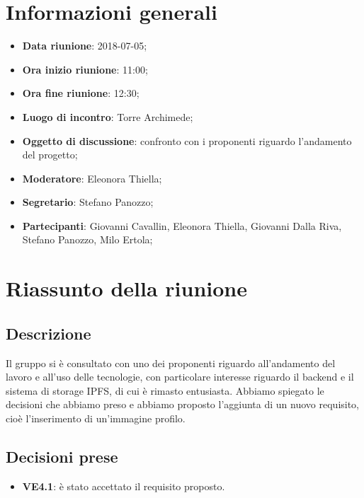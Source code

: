 \section{Informazioni generali}
	\begin{itemize}
		\item \textbf{Data riunione}: 2018-07-05;
		\item \textbf{Ora inizio riunione}: 11:00;
		\item \textbf{Ora fine riunione}: 12:30;
		\item \textbf{Luogo di incontro}: Torre Archimede;
		\item \textbf{Oggetto di discussione}: confronto con i proponenti riguardo l'andamento del progetto;
		\item \textbf{Moderatore}: Eleonora Thiella;
		\item \textbf{Segretario}: Stefano Panozzo;
		\item \textbf{Partecipanti}: Giovanni Cavallin, Eleonora Thiella, Giovanni Dalla Riva, Stefano Panozzo, Milo Ertola;
	\end{itemize}

\section{Riassunto della riunione}
	\subsection{Descrizione} 
	Il gruppo si è consultato con uno dei proponenti riguardo all'andamento del lavoro e all'uso delle tecnologie, con particolare interesse riguardo il backend e il sistema di storage IPFS, di cui è rimasto entusiasta.
	Abbiamo spiegato le decisioni che abbiamo preso e abbiamo proposto l'aggiunta di un nuovo requisito, cioè l'inserimento di un'immagine profilo.
	
	\subsection{Decisioni prese}
		\begin{itemize}
			\item \textbf{VE4.1}: è stato accettato il requisito proposto.
		\end{itemize}